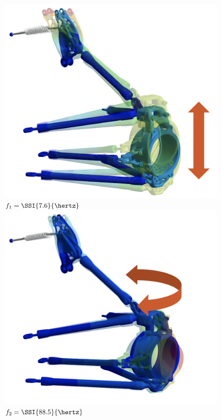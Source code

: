 \begin{figure}[htb]
  \centering
  \begin{minipage}[c]{0.575\linewidth}
    \small{}
  \end{minipage}
  \begin{minipage}[c]{0.125\linewidth}
    \vspace{-2.5em}
    \begin{center}
      \includegraphics[width=1.0\linewidth]{./figures/appendix_4/mode1.png} \\ \small{$f_1 = \SSI{7.6}{\hertz}$} \\[0.8in]
      \includegraphics[width=1.0\linewidth]{./figures/appendix_4/mode2.png} \\ \small{$f_2 = \SSI{88.5}{\hertz}$} \\[0.8in]

\end{center}
\end{minipage}
\end{figure}
